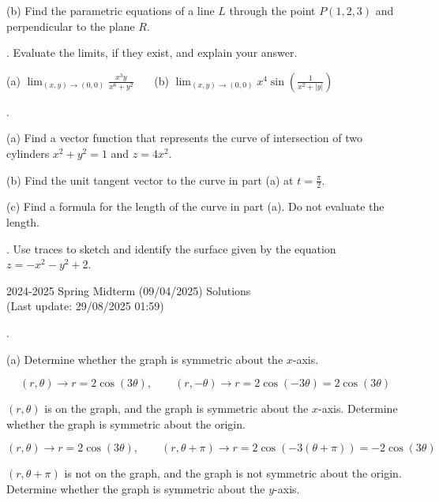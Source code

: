 \documentclass{article}
\begin{document}
\noindent (b) Find the parametric equations of a line $L$ through the point $P(1,2,3)$ and perpendicular to the plane $R$.

\hfill

. Evaluate the limits, if they exist, and explain your answer.

\hfill

\noindent (a) $\displaystyle\lim_{(x,y)\to(0,0)}\frac{x^3y}{x^6+y^2}$ \ \ \ (b) $\displaystyle\lim_{(x,y)\to(0,0)}x^4\sin\left(\frac1{x^2+\left|y\right|}\right)$ \ \ \ 

\hfill

.

\hfill

\noindent (a) Find a vector function that represents the curve of intersection of two cylinders $x^2+y^2=1$ and $z=4x^2$.

\hfill

\noindent (b) Find the unit tangent vector to the curve in part (a) at $\displaystyle t=\frac\pi2$.

\hfill

\noindent (c) Find a formula for the length of the curve in part (a). Do not evaluate the length.

\hfill

. Use traces to sketch and identify the surface given by the equation $z=-x^2-y^2+2$.

\newpage

\begin{center}
2024-2025 Spring Midterm (09/04/2025) Solutions\\
(Last update: 29/08/2025 01:59)
\end{center}

.

\hfill

\noindent (a) Determine whether the graph is symmetric about the $x$-axis.

\[(r,\theta)\rightarrow r=2\cos(3\theta),\qquad (r,-\theta)\rightarrow r=2\cos(-3\theta)=2\cos(3\theta)\]

\hfill

\noindent $(r,\theta)$ is on the graph, and the graph is symmetric about the $x$-axis. Determine whether the graph is symmetric about the origin.

\[(r,\theta)\rightarrow r=2\cos(3\theta),\qquad (r,\theta+\pi)\rightarrow r=2\cos(-3(\theta+\pi))=-2\cos(3\theta)\]

\hfill

\noindent $(r,\theta+\pi)$ is not on the graph, and the graph is not symmetric about the origin. Determine whether the graph is symmetric about the $y$-axis.
\end{document}
